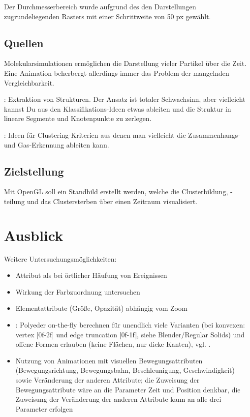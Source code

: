 Der Durchmesserbereich wurde aufgrund des den Darstellungen zugrundeliegenden Rasters mit einer Schrittweite von 50 \gls{px} gewählt.

\section{Quellen}
Molekularsimulationen ermöglichen die Darstellung vieler Partikel über die Zeit. Eine Animation beherbergt allerdings immer das Problem der mangelnden Vergleichbarkeit.

\cite{topoinvis09grottel}: Extraktion von Strukturen. Der Ansatz ist totaler Schwachsinn, aber vielleicht kannst Du aus den Klassifikations-Ideen etwas ableiten und die Struktur in lineare Segmente und Knotenpunkte zu zerlegen. 

\cite{vis07grottel}: Ideen für Clustering-Kriterien aus denen man vielleicht die Zusammenhangs- und Gas-Erkennung ableiten kann.

\section{Zielstellung}
Mit OpenGL soll ein Standbild erstellt werden, welche die Clusterbildung, -teilung und das Clustersterben über einen Zeitraum visualisiert.


\chapter{Ausblick}
Weitere Untersuchungsmöglichkeiten:
\begin{itemize}
	\item Attribut  als  bei örtlicher Häufung von Ereignissen
	\item Wirkung der Farbzuordnung untersuchen
	\item Elementattribute (Größe, Opazität) abhängig vom Zoom
	\item {}: Polyeder on-the-fly berechnen für unendlich viele Varianten (bei konvexen: vertex [0f-2f] und edge truncation [0f-1f], siehe Blender/Regular Solids) und offene Formen erlauben (keine Flächen, nur dicke Kanten), vgl. \cite{WebGLUniformPolyhedra}.
	\item Nutzung von Animationen mit visuellen Bewegungsattributen (Bewegungsrichtung, Bewegungsbahn, Beschleunigung, Geschwindigkeit) sowie Veränderung der anderen Attribute; die Zuweisung der Bewegungsattribute wäre an die Parameter Zeit und Position denkbar, die Zuweisung der Veränderung der anderen Attribute kann an alle drei Parameter erfolgen
\end{itemize}




